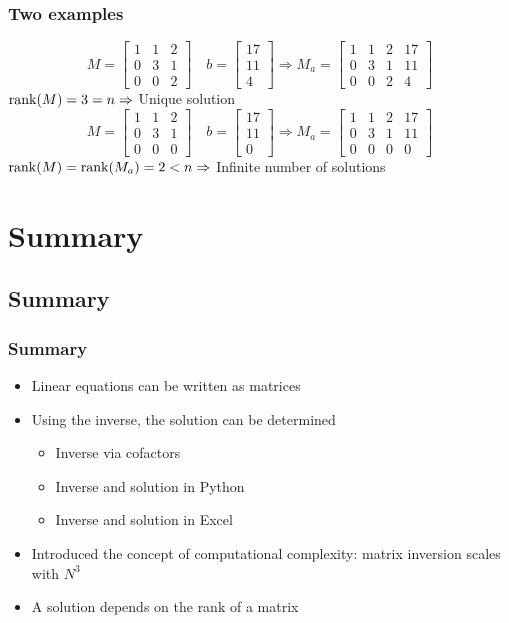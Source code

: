 \begin{frame}[fragile]
  \frametitle{Two examples}
  \[
    M=
    \begin{bmatrix}
      1 & 1 & 2\\
      0 & 3 & 1\\
      0 & 0 & 2
    \end{bmatrix}\quad
    b=
    \begin{bmatrix}
      17\\11\\4
    \end{bmatrix}
    \Rightarrow
    M_a=
    \begin{bmatrix}
      1 & 1 & 2 & 17\\
      0 & 3 & 1 & 11\\
      0 & 0 & 2 & 4
    \end{bmatrix}
  \]
  $\operatorname{rank}(M)=3=n \Rightarrow $ Unique solution \pause \\ \vfill
    \[
    M=
    \begin{bmatrix}
      1 & 1 & 2\\
      0 & 3 & 1\\
      0 & 0 & 0
    \end{bmatrix}\quad
    b=
    \begin{bmatrix}
      17\\11\\0
    \end{bmatrix}
    \Rightarrow
    M_a=
    \begin{bmatrix}
      1 & 1 & 2 & 17\\
      0 & 3 & 1 & 11\\
      0 & 0 & 0 & 0
    \end{bmatrix}
  \]
  $\operatorname{rank}(M)=\operatorname{rank}(M_a)=2<n \Rightarrow $ Infinite number of solutions
\end{frame} 

\section{Summary}
\subsection*{Summary}

\begin{frame}[fragile]
  \frametitle{Summary}
  \begin{itemize}
    \item Linear equations can be written as matrices
    \item Using the inverse, the solution can be determined
    \begin{itemize}
      \item Inverse via cofactors
      \item Inverse and solution in Python
      \item Inverse and solution in Excel
    \end{itemize}
    \item Introduced the concept of computational complexity: matrix inversion scales with $N^3$
    \item A solution depends on the rank of a matrix
  \end{itemize}
\end{frame}